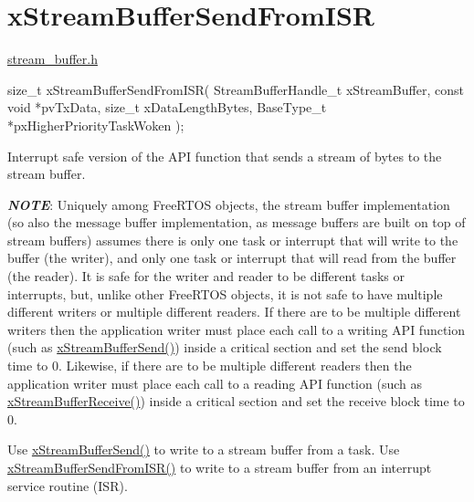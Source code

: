 \hypertarget{group__x_stream_buffer_send_from_i_s_r}{}\section{x\+Stream\+Buffer\+Send\+From\+I\+SR}
\label{group__x_stream_buffer_send_from_i_s_r}
\hyperlink{stream__buffer_8h}{stream\+\_\+buffer.\+h}


\begin{DoxyPre}
size\_t xStreamBufferSendFromISR( StreamBufferHandle\_t xStreamBuffer,
                              const void *pvTxData,
                              size\_t xDataLengthBytes,
                              BaseType\_t *pxHigherPriorityTaskWoken );
\end{DoxyPre}


Interrupt safe version of the A\+PI function that sends a stream of bytes to the stream buffer.

{\itshape {\bfseries N\+O\+TE}}\+: Uniquely among Free\+R\+T\+OS objects, the stream buffer implementation (so also the message buffer implementation, as message buffers are built on top of stream buffers) assumes there is only one task or interrupt that will write to the buffer (the writer), and only one task or interrupt that will read from the buffer (the reader). It is safe for the writer and reader to be different tasks or interrupts, but, unlike other Free\+R\+T\+OS objects, it is not safe to have multiple different writers or multiple different readers. If there are to be multiple different writers then the application writer must place each call to a writing A\+PI function (such as \hyperlink{stream__buffer_8h_a35cdf3b6bf677086b9128782f762499d}{x\+Stream\+Buffer\+Send()}) inside a critical section and set the send block time to 0. Likewise, if there are to be multiple different readers then the application writer must place each call to a reading A\+PI function (such as \hyperlink{stream__buffer_8h_a55efc144b988598d84a6087d3e20b507}{x\+Stream\+Buffer\+Receive()}) inside a critical section and set the receive block time to 0.

Use \hyperlink{stream__buffer_8h_a35cdf3b6bf677086b9128782f762499d}{x\+Stream\+Buffer\+Send()} to write to a stream buffer from a task. Use \hyperlink{stream__buffer_8h_a1dab226e99230e01e79bc2b5c0605e44}{x\+Stream\+Buffer\+Send\+From\+I\+S\+R()} to write to a stream buffer from an interrupt service routine (I\+SR).



